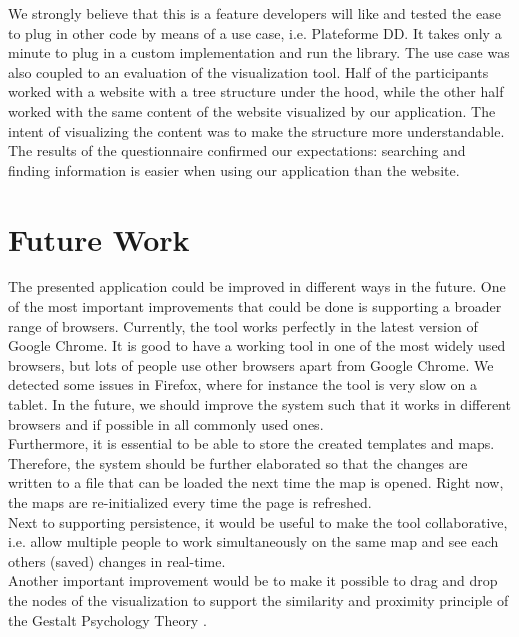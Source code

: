 We strongly believe that this is a feature developers will like and tested the ease to plug in other code by means of a use case, i.e. Plateforme DD. It takes only a minute to plug in a custom implementation and run the library. The use case was also coupled to an evaluation of the visualization tool. Half of the participants worked with a website with a tree structure under the hood, while the other half worked with the same content of the website visualized by our application. The intent of visualizing the content was to make the structure more understandable. The results of the questionnaire confirmed our expectations: searching and finding information is easier when using our application than the website.


\section{Future Work}\label{sec:future-work}

The presented application could be improved in different ways in the future. One of the most important improvements that could be done is supporting a broader range of browsers. Currently, the tool works perfectly in the latest version of Google Chrome. It is good to have a working tool in one of the most widely used browsers, but lots of people use other browsers apart from Google Chrome. We detected some issues in Firefox, where for instance the tool is very slow on a tablet. In the future, we should improve the system such that it works in different browsers and if possible in all commonly used ones.\\

Furthermore, it is essential to be able to store the created templates and maps. Therefore, the system should be further elaborated so that the changes are written to a file that can be loaded the next time the map is opened. Right now, the maps are re-initialized every time the page is refreshed.\\

Next to supporting persistence, it would be useful to make the tool collaborative, i.e. allow multiple people to work simultaneously on the same map and see each others (saved) changes in real-time.\\

Another important improvement would be to make it possible to drag and drop the nodes of the visualization to support the similarity and proximity principle of the Gestalt Psychology Theory \citep{koffka2013principles}.\\
